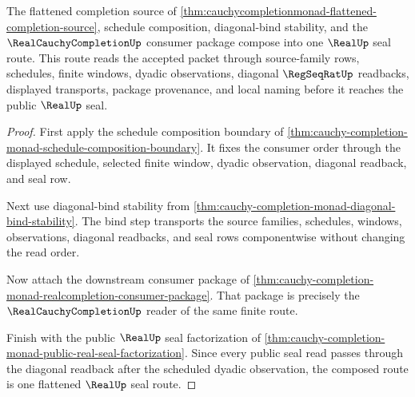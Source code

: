 \begin{theorem}
\label{thm:cauchycompletionmonad-flattened-seal-route}
The flattened completion source of \autoref{thm:cauchycompletionmonad-flattened-completion-source}, schedule composition, diagonal-bind stability, and the $\RealCauchyCompletionUp$ consumer package compose into one $\RealUp$ seal route. This route reads the accepted packet through source-family rows, schedules, finite windows, dyadic observations, diagonal $\RegSeqRatUp$ readbacks, displayed transports, package provenance, and local naming before it reaches the public $\RealUp$ seal.
\end{theorem}
\begin{proof}
First apply the schedule composition boundary of \autoref{thm:cauchy-completion-monad-schedule-composition-boundary}. It fixes the consumer order through the displayed schedule, selected finite window, dyadic observation, diagonal readback, and seal row.

Next use diagonal-bind stability from \autoref{thm:cauchy-completion-monad-diagonal-bind-stability}. The bind step transports the source families, schedules, windows, observations, diagonal readbacks, and seal rows componentwise without changing the read order.

Now attach the downstream consumer package of \autoref{thm:cauchy-completion-monad-realcompletion-consumer-package}. That package is precisely the $\RealCauchyCompletionUp$ reader of the same finite route.

Finish with the public $\RealUp$ seal factorization of \autoref{thm:cauchy-completion-monad-public-real-seal-factorization}. Since every public seal read passes through the diagonal readback after the scheduled dyadic observation, the composed route is one flattened $\RealUp$ seal route.
\end{proof}

